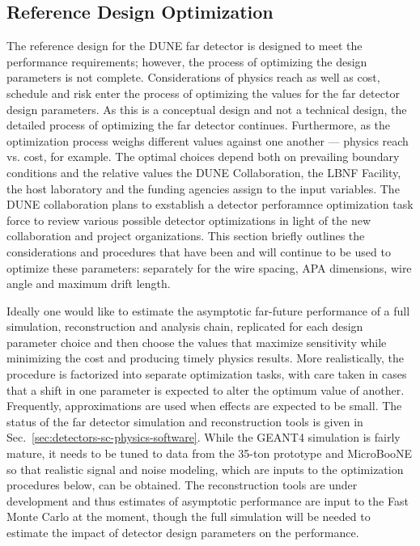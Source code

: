 \subsection{Reference Design Optimization}
\label{sec:detectors-fd-ref-optimization}

The reference design for the DUNE far detector is designed to meet the
performance requirements; however, the process of optimizing the
design parameters is not complete.  Considerations of physics reach as
well as cost, schedule and risk enter the process of optimizing the
values for the far detector design parameters.  As this is a
conceptual design and not a technical design, the detailed process of
optimizing the far detector continues.  Furthermore, as the
optimization process weighs different values against one another ---
physics reach vs. cost, for example. The optimal choices depend both
on prevailing boundary conditions and the relative values the DUNE
Collaboration, the LBNF Facility, the host laboratory and the funding
agencies assign to the input variables. The DUNE collaboration plans
to exstablish a detector perforamnce optimization task force to review
various possible detector optimizations in light of the new
collaboration and project organizations. This section briefly outlines
the considerations and procedures that have been and will continue to
be used to optimize these parameters: separately for the wire spacing,
APA dimensions, wire angle and maximum drift length.

Ideally one would like to estimate the asymptotic far-future
performance of a full simulation, reconstruction and analysis chain, replicated 
for each design parameter choice and then choose the values that maximize sensitivity
while minimizing the cost and producing timely physics results.
More realistically, the procedure is factorized into separate optimization tasks, with
care taken in cases that a shift in one parameter is expected to alter the optimum value
of another.  Frequently, approximations are used when effects are expected to be small.
The status of the far detector simulation and reconstruction tools is given in 
Sec.~\ref{sec:detectors-sc-physics-software}.  While the GEANT4 simulation is fairly mature,
it needs to be tuned to data from the 35-ton prototype and MicroBooNE so that realistic
signal and noise modeling, which are inputs to the optimization procedures below, can be obtained.
The reconstruction tools are under development and thus estimates of asymptotic performance
are input to the Fast Monte Carlo at the moment, though the full simulation will be needed
to estimate the impact of detector design parameters on the performance.

